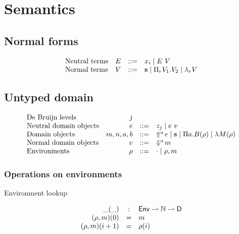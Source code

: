\section{Semantics}
\label{app:pts-semantics}

\subsection{Normal forms}

\[
\begin{array}{lrcl}
  \mbox{Neutral terms}        & E      & ::= & x_i \mid \tmapp E V \\
  \mbox{Normal terms}         & V      & ::= & \tmcst s \mid \tppi {V_1} {V_2} \mid \tmlam V \\
\end{array}
\]

\subsection{Untyped domain}

\[
\begin{array}{lrcl}             
  \mbox{De Bruijn levels}       & j \\
  \mbox{Neutral domain objects} & e       & ::=  & z_j \mid e~v \\
  \mbox{Domain objects}         & m,n,a,b & ::=  & \Uparrow^{a}\!e \mid \textbf{s} \mid \Pi a.B(\rho) \mid \lambda M(\rho)  \\
  \mbox{Normal domain objects}  & v       & ::=  & \Downarrow^{a}\!m \\
  \mbox{Environments}           & \rho    & ::=  & \cdot \mid \rho, m \\
\end{array}
\]

\subsubsection{Operations on environments}

\noindent
Environment lookup

\[
\begin{array}{rcl}
  \_(\_)                       & : & \mathsf{Env} \rightharpoonup \mathbb{N} \rightharpoonup \mathsf{D} \\
  (\rho, m)(0)       & = & m \\
  (\rho, m)(i + 1) & = & \rho(i)
\end{array}
\]

